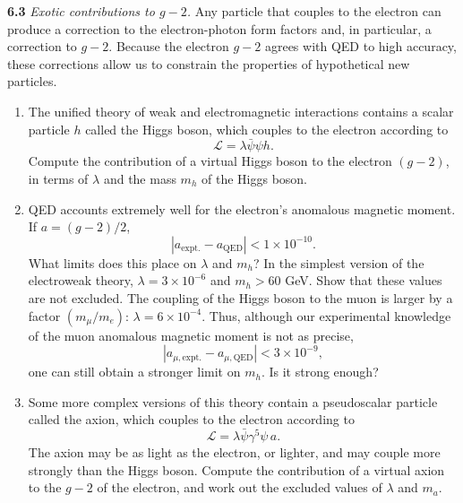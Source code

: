 \textbf{6.3} \emph{Exotic contributions to $g-2$.}  Any particle that couples
to the electron can produce a correction to the electron-photon form factors
and, in particular, a correction to $g-2$.  Because the electron $g-2$ agrees
with QED to high accuracy, these corrections allow us to constrain the
properties of hypothetical new particles.
\begin{enumerate}[label=(\alph*)]
  \item The unified theory of weak and electromagnetic interactions contains
    a scalar particle $h$ called the Higgs boson, which couples to the electron
    according to
    \begin{equation}
      \mathcal{L} = \lambda\bar{\psi}\psi h .
    \end{equation}
    Compute the contribution of a virtual Higgs boson to the electron
    $(g-2)$, in terms of $\lambda$ and the mass $m_h$ of the Higgs boson.
  \item QED accounts extremely well for the electron's anomalous magnetic
    moment.  If $a = (g-2)/2$,
    \begin{equation}
      |a_{\mathrm{expt.}} - a_{\mathrm{QED}}| < 1\times10^{-10} .
    \end{equation}
    What limits does this place on $\lambda$ and $m_h$?  In the simplest
    version of the electroweak theory, $\lambda = 3\times10^{-6}$ and
    $m_h > 60$ GeV.  Show that these values are not excluded.  The coupling of
    the Higgs boson to the muon is larger by a factor $(m_\mu/m_e)$:
    $\lambda = 6\times10^{-4}$.  Thus, although our experimental knowledge of
    the muon anomalous magnetic moment is not as precise,
    \begin{equation}
      |a_{\mu,\mathrm{expt.}} - a_{\mu,\mathrm{QED}}| < 3\times10^{-9},
    \end{equation}
    one can still obtain a stronger limit on $m_h$.  Is it strong enough?
  \item Some more complex versions of this theory contain a pseudoscalar
    particle called the axion, which couples to the electron according to
    \begin{equation}
      \mathcal{L} = \lambda\bar{\psi}\gamma^5\psi\,a .
    \end{equation}
    The axion may be as light as the electron, or lighter, and may couple more
    strongly than the Higgs boson.  Compute the contribution of a virtual
    axion to the $g-2$ of the electron, and work out the excluded values of
    $\lambda$ and $m_a$.
\end{enumerate}
